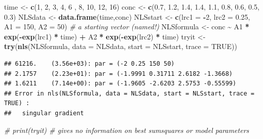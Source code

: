 \documentclass[
]{article}
\newenvironment{Shaded}{\begin{snugshade}}{\end{snugshade}}
\newcommand{\AttributeTok}[1]{\textcolor[rgb]{0.13,0.29,0.53}{#1}}
\newcommand{\CommentTok}[1]{\textcolor[rgb]{0.56,0.35,0.01}{\textit{#1}}}
\newcommand{\ConstantTok}[1]{\textcolor[rgb]{0.56,0.35,0.01}{#1}}
\newcommand{\DecValTok}[1]{\textcolor[rgb]{0.00,0.00,0.81}{#1}}
\newcommand{\FloatTok}[1]{\textcolor[rgb]{0.00,0.00,0.81}{#1}}
\newcommand{\FunctionTok}[1]{\textcolor[rgb]{0.13,0.29,0.53}{\textbf{#1}}}
\newcommand{\NormalTok}[1]{#1}
\newcommand{\OtherTok}[1]{\textcolor[rgb]{0.56,0.35,0.01}{#1}}
\newcommand{\SpecialCharTok}[1]{\textcolor[rgb]{0.81,0.36,0.00}{\textbf{#1}}}
\begin{document}
\begin{Shaded}
\begin{Highlighting}[]
\NormalTok{time }\OtherTok{\textless{}{-}} \FunctionTok{c}\NormalTok{(}\DecValTok{1}\NormalTok{,  }\DecValTok{2}\NormalTok{,  }\DecValTok{3}\NormalTok{,  }\DecValTok{4}\NormalTok{,  }\DecValTok{6}\NormalTok{ , }\DecValTok{8}\NormalTok{, }\DecValTok{10}\NormalTok{, }\DecValTok{12}\NormalTok{, }\DecValTok{16}\NormalTok{)}
\NormalTok{conc }\OtherTok{\textless{}{-}} \FunctionTok{c}\NormalTok{(}\FloatTok{0.7}\NormalTok{, }\FloatTok{1.2}\NormalTok{, }\FloatTok{1.4}\NormalTok{, }\FloatTok{1.4}\NormalTok{, }\FloatTok{1.1}\NormalTok{, }\FloatTok{0.8}\NormalTok{, }\FloatTok{0.6}\NormalTok{, }\FloatTok{0.5}\NormalTok{, }\FloatTok{0.3}\NormalTok{)}
\NormalTok{NLSdata }\OtherTok{\textless{}{-}} \FunctionTok{data.frame}\NormalTok{(time,conc)}
\NormalTok{NLSstart }\OtherTok{\textless{}{-}} \FunctionTok{c}\NormalTok{(}\AttributeTok{lrc1 =} \SpecialCharTok{{-}}\DecValTok{2}\NormalTok{, }\AttributeTok{lrc2 =} \FloatTok{0.25}\NormalTok{, }\AttributeTok{A1 =} \DecValTok{150}\NormalTok{, }\AttributeTok{A2 =} \DecValTok{50}\NormalTok{) }\CommentTok{\# a starting vector (named!)}
\NormalTok{NLSformula }\OtherTok{\textless{}{-}}\NormalTok{ conc }\SpecialCharTok{\textasciitilde{}}\NormalTok{ A1 }\SpecialCharTok{*} \FunctionTok{exp}\NormalTok{(}\SpecialCharTok{{-}}\FunctionTok{exp}\NormalTok{(lrc1) }\SpecialCharTok{*}\NormalTok{ time) }\SpecialCharTok{+}\NormalTok{ A2 }\SpecialCharTok{*} \FunctionTok{exp}\NormalTok{(}\SpecialCharTok{{-}}\FunctionTok{exp}\NormalTok{(lrc2) }\SpecialCharTok{*}\NormalTok{ time)}
\NormalTok{tryit }\OtherTok{\textless{}{-}} \FunctionTok{try}\NormalTok{(}\FunctionTok{nls}\NormalTok{(NLSformula, }\AttributeTok{data =}\NormalTok{ NLSdata, }\AttributeTok{start =}\NormalTok{ NLSstart, }\AttributeTok{trace =} \ConstantTok{TRUE}\NormalTok{))}
\end{Highlighting}
\end{Shaded}

\begin{verbatim}
## 61216.    (3.56e+03): par = (-2 0.25 150 50)
## 2.1757    (2.23e+01): par = (-1.9991 0.31711 2.6182 -1.3668)
## 1.6211    (7.14e+00): par = (-1.9605 -2.6203 2.5753 -0.55599)
## Error in nls(NLSformula, data = NLSdata, start = NLSstart, trace = TRUE) : 
##   singular gradient
\end{verbatim}

\begin{Shaded}
\begin{Highlighting}[]
\CommentTok{\# print(tryit) \# gives no information on best sumsquares or model parameters}
\end{Highlighting}
\end{Shaded}
\end{document}
